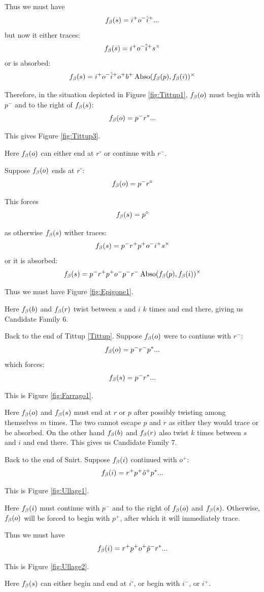 Thus we must have
$$f_\beta(s) = i^+ o^- \hat{i}^+...$$
but now it either traces:
$$f_\beta(s) = i^+ o^- \hat{i}^+ s^\times$$
or is absorbed:
$$f_\beta(s) = i^+ o^- \hat{i}^+ o^+ b^+ \operatorname{Abso}(f_\beta(p), f_\beta(i))^\times$$

Therefore, in the situation depicted in Figure \ref{fig:Tittup1}, $f_\beta(o)$ must begin with $p^-$ and to the right of $f_\beta(s)$:
$$f_\beta(o) = p^- r^*...$$

This gives Figure \ref{fig:Tittup3}. 

Here $f_\beta(o)$ can either end at $r^\circ$ or continue with $r^-$.

\label{Epigone}
Suppose $f_\beta(o)$ ends at $r^\circ$:
$$f_\beta(o) = p^- r^\circ$$

This forces
$$f_\beta(s) = p^\circ$$

as otherwise $f_\beta(s)$ wither traces:
$$f_\beta(s) = p^- r^+ p^+ o^- i^+ s^\times$$
or it is absorbed:
$$f_\beta(s) = p^- r^+ p^+ o^- p^- r^- \operatorname{Abso}(f_\beta(p), f_\beta(i))^\times$$

Thus we must have Figure \ref{fig:Epigone1}.

Here $f_\beta(b)$ and $f_\beta(r)$ twist between $s$ and $i$ $k$ times and end there, giving us Candidate Family 6.

\label{Farrago}
Back to the end of Tittup \ref{Tittup}. Suppose $f_\beta(o)$ were to continue with $r^-$:
$$f_\beta(o) = p^- r^- p^*...$$
which forces:
$$f_\beta(s) = p^- r^*...$$

This is Figure \ref{fig:Farrago1}.

Here $f_\beta(o)$ and $f_\beta(s)$ must end at $r$ or $p$ after possibly twisting among themselves $m$ times. The two cannot escape $p$ and $r$ as either they would trace or be absorbed. On the other hand $f_\beta(b)$ and $f_\beta(r)$ also twist $k$ times between $s$ and $i$ and end there. This gives us Candidate Family 7.

Back to the end of Snirt. Suppose $f_\beta(i)$ continued with $o^+$:
$$f_\beta(i) = r^+ p^+ \hat{o}^+ p^*...$$

This is Figure \ref{fig:Ullage1}.

Here $f_\beta(i)$ must continue with $p^-$ and to the right of $f_\beta(o)$ and $f_\beta(s)$. Otherwise, $f_\beta(o)$ will be forced to begin with $p^+$, after which it will immediately trace.

Thus we must have
$$f_\beta(i) = r^+ p^+ o^+ \hat{p}^- r^*...$$

This is Figure \ref{fig:Ullage2}.

Here $f_\beta(s)$ can either begin and end at $i^\circ$, or begin with $i^-$, or $i^+$.

